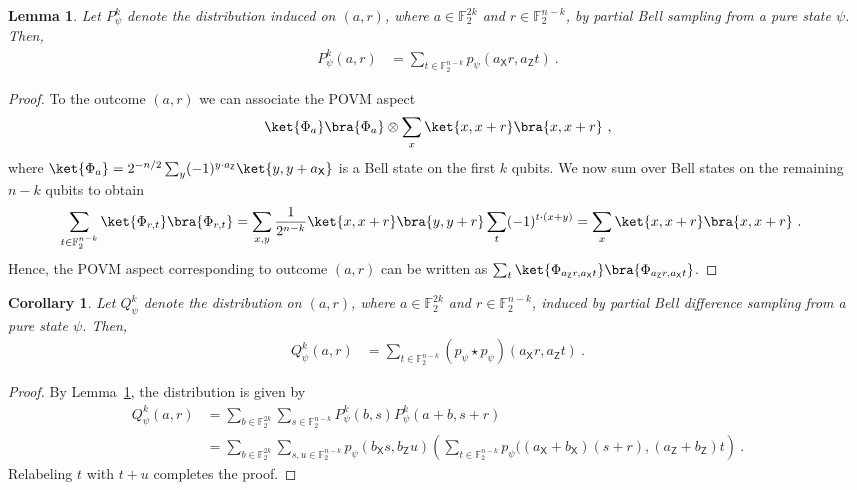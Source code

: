 \documentclass[11pt]{article}
\newtheorem{corollary}[theorem]{Corollary}
\newtheorem{lemma}[theorem]{Lemma}
\newcommand{\Z}{\mathsf{Z}}
\newcommand{\X}{\mathsf{X}}
\newcommand{\F}{\mathbb{F}}
\begin{document}
\begin{lemma}\label{lem:partial_bell_marginal}
    Let $P^k_\psi$ denote the distribution induced on $(a,r)$, where $a\in\F_2^{2k}$ and $r\in\F_2^{n-k}$, by partial Bell sampling from a pure state $\psi$. Then,
    \begin{align}
        P^k_\psi(a,r) & = \sum_{t\in \F_2^{n-k}} p_\psi(a_\X r, a_\Z t)\ .
    \end{align}
\end{lemma}
\begin{proof}
    To the outcome $(a,r)$ we can associate the POVM aspect
    \begin{align}
        \ket{\Phi_a}\bra{\Phi_a} \otimes \sum_x \ket{x,x+r}\bra{x,x+r}\ ,
    \end{align}
    where $\ket{\Phi_a} = 2^{-n/2}\sum_y (-1)^{y\cdot a_\Z}\ket{y,y+a_\X}$ is a Bell state on the first $k$ qubits. We now sum over Bell states on the remaining $n-k$ qubits to obtain
    \begin{align}
        \sum_{t\in\F_2^{n-k}} \ket{\Phi_{r,t}}\bra{\Phi_{r,t}} & = \sum_{x,y }\frac{1}{2^{n-k}} \ket{x,x+r}\bra{y,y+r} \sum_t (-1)^{t\cdot (x+y)} = \sum_x \ket{x,x+r}\bra{x,x+r}\ .
    \end{align}
    Hence, the POVM aspect corresponding to outcome $(a,r)$ can be written as $\sum_{t}\ket{\Phi_{a_\Z r, a_\X t}}\bra{\Phi_{a_\Z r, a_\X t}}$. 
\end{proof}
\begin{corollary}\label{corr:partial_bell_diff}
    Let $Q_\psi^k$ denote the distribution on $(a,r)$, where $a\in \F_2^{2k}$ and $r \in \F_2^{n-k}$, induced by partial Bell difference sampling from a pure state $\psi$. Then,
    \begin{align}
        Q_\psi^k(a,r) & = \sum_{t\in\F_2^{n-k}} (p_\psi \star p_\psi)(a_\X r, a_\Z t)\ .
    \end{align}
\end{corollary}
\begin{proof}
    By Lemma~\ref{lem:partial_bell_marginal}, the distribution is given by
    \begin{align}
        Q_\psi^k(a,r) & = \sum_{b\in\F_2^{2k}}\sum_{s\in\F_2^{n-k}} P_\psi^k(b,s)P_\psi^k(a+b,s+r)\\
        & = \sum_{b\in\F_2^{2k}}\sum_{s,u\in\F_2^{n-k}}  p_\psi(b_\X s, b_\Z u)\left( \sum_{t\in\F_2^{n-k}}p_\psi((a_\X + b_\X)(s+r), (a_\Z + b_\Z)t \right)\ .
    \end{align}
    Relabeling $t$ with $t+u$ completes the proof.
\end{proof}
\end{document}
